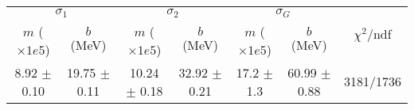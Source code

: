 \begin{tabular}{cc|cc|cc||c}
\multicolumn{2}{c|}{$\sigma_1$} & \multicolumn{2}{|c}{$\sigma_2$} & \multicolumn{2}{|c}{$\sigma_G$}  & \multirow{2}{*}{$\chi^2/$ndf}\\
$m$ ($\times1e5$) & $b$ (MeV) & $m$ ($\times1e5$) & $b$ (MeV) & $m$ ($\times1e5$) & $b$ (MeV) & \\
\hline
8.92 $\pm$ 0.10 & 19.75 $\pm$ 0.11 & 10.24 $\pm$ 0.18 & 32.92 $\pm$ 0.21 & 17.2 $\pm$ 1.3 & 60.99 $\pm$ 0.88 & 3181/1736\\
\end{tabular}

